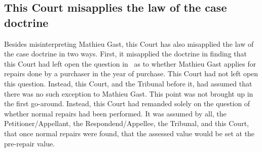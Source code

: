 \documentclass[12pt,\documentclassflag]{michiganCourtOfAppealsBrief}
\begin{document}







 \subsection{This Court misapplies the law of the case doctrine}

Besides misinterpreting Mathieu Gast, this Court has also misapplied the law of the case doctrine in two ways. First, it misapplied the doctrine in finding that this Court had left open the question in \cite{Patru 1}\ as to whether Mathieu Gast applies for repairs done by a purchaser in the year of purchase. This Court had not left open this question. Instead, this Court, and the Tribunal before it, had assumed that there was no such exception to Mathieu Gast. This point was not brought up in the first go-around.
Instead, this Court had remanded solely on the question of whether normal repairs had been performed. 
It was assumed by all, the Petitioner/Appellant, the Respondend/Appellee, the Tribunal, and this Court, that once normal repairs were found, that the assessed value would be set at the pre-repair value.
\end{document}
